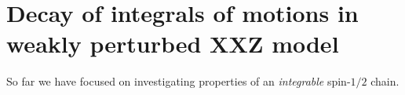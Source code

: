 \chapter{Decay of integrals of motions in weakly perturbed XXZ model}
\thispagestyle{chapterBeginStyle}

So far we have focused on investigating properties of an \textit{integrable} spin-\(1/2\) chain.

